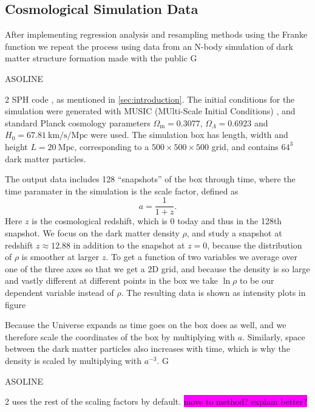 \documentclass[aps,pra,english,notitlepage,reprint,nofootinbib]{revtex4-1}  %
\begin{document}
\subsection{Cosmological Simulation Data}\label{subsec:simulation}
After implementing regression analysis and resampling methods using the Franke function we repeat the process using data from an N-body simulation of dark matter structure formation made with the public G\begin{footnotesize}ASOLINE\end{footnotesize}2 SPH code \cite{gasoline}, as mentioned in \cref{sec:introduction}. The initial conditions for the simulation were generated with MUSIC (MUlti-Scale Initial Conditions) \cite{music}, and standard Planck cosmology parameters $\Omega_\text{m}=0.3077$, $\Omega_{\Lambda}=0.6923$ and $H_0=67.81\:\text{km/s/Mpc}$ were used. The simulation box has length, width and height $L=20\:\text{Mpc}$, corresponding to a $500\times500\times500$ grid, and contains $64^3$ dark matter particles. 

The output data includes 128 ``snapshots'' of the box through time, where the time paramater in the simulation is the scale factor, defined as
\begin{equation}
  a = \frac{1}{1+z}.
\end{equation}
Here $z$ is the cosmological redshift, which is 0 today and thus in the 128th snapshot. We focus on the dark matter density $\rho$, and study a snapshot at redshift $z\approx12.88$ in addition to the snapshot at $z=0$, because the distribution of $\rho$ is smoother at larger $z$. To get a function of two variables we average over one of the three axes so that we get a 2D grid, and because the density is so large and vastly different at different points in the box we take $\ln\rho$ to be our dependent variable instead of $\rho$. The resulting data is shown as intensity plots in figure %

Because the Universe expands as time goes on the box does as well, and we therefore scale the coordinates of the box by multiplying with $a$. Similarly, space between the dark matter particles also increases with time, which is why the density is scaled by multiplying with $a^{-3}$. G\begin{footnotesize}ASOLINE\end{footnotesize}2 uses the rest of the scaling factors by default. \colorbox{magenta}{move to method? explain better?}
\end{document}
